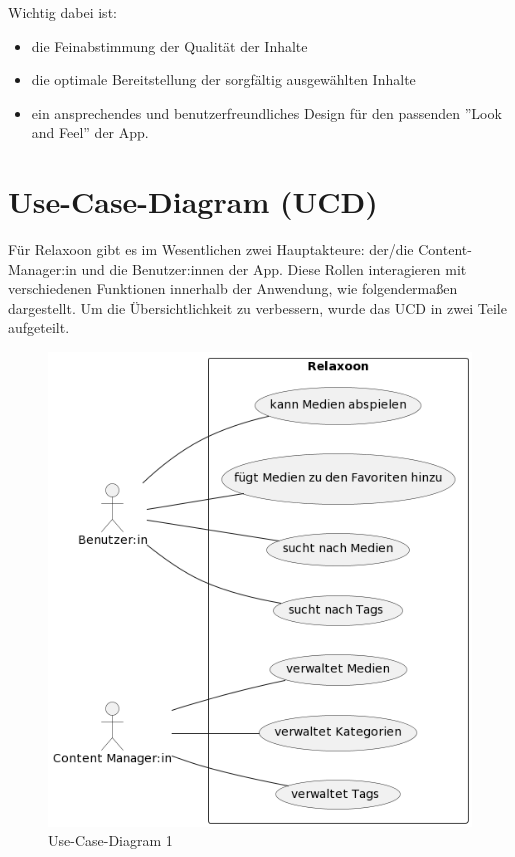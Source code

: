 Wichtig dabei ist: 

\begin{itemize}
    \item die Feinabstimmung der Qualität der Inhalte
    \item die optimale Bereitstellung der sorgfältig ausgewählten Inhalte
    \item ein ansprechendes und benutzerfreundliches Design für den passenden ''Look and Feel'' der App.
\end{itemize}

\section{Use-Case-Diagram (UCD)}

Für Relaxoon gibt es im Wesentlichen zwei Hauptakteure: der/die Content-Manager:in und die Benutzer:innen der 
App. Diese Rollen interagieren mit verschiedenen Funktionen innerhalb der Anwendung, wie folgendermaßen 
dargestellt. Um die Übersichtlichkeit zu verbessern, wurde das UCD in zwei Teile aufgeteilt.

\begin{figure}[H]
    \centering
    \includegraphics[height=\textwidth]{./pics/ucd1.png}
    \caption{Use-Case-Diagram 1}
\end{figure}


